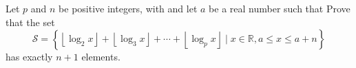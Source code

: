 Let $p$ and $n$ be positive integers, with  and let $a$ be a real number such that  Prove that the set
\[ \mathcal {S}=\left\{\left\lfloor \log_{2}x\right\rfloor +\left\lfloor \log_{3}x\right\rfloor +\cdots+\left\lfloor \log_{p}x\right\rfloor\mid x\in\mathbb{R},a\leq x\leq a+n\right\} \]
has exactly $n+1$ elements.